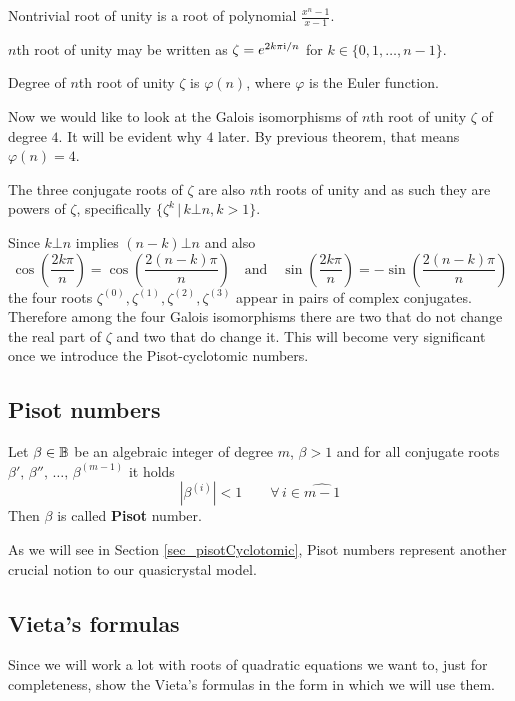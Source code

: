 \documentclass[text.tex]{subfiles}
\begin{document}
\begin{remark}
Nontrivial root of unity is a root of polynomial $\frac{x^n-1}{x-1}$.
\end{remark}

\begin{remark}
$n$th root of unity may be written as $\zeta = e^{2k\pi \mathrm{i}/n}$ for $k\in \{0, 1, \dots, n-1\}$.
\end{remark}

\begin{theorem}
Degree of $n$th root of unity $\zeta$ is $\varphi(n)$, where $\varphi$ is the Euler function.
\end{theorem}

Now we would like to look at the Galois isomorphisms of $n$th root of unity $\zeta$ of degree $4$. It will be evident why $4$ later. By previous theorem, that means $\varphi(n)=4$. 

The three conjugate roots of $\zeta$ are also $n$th roots of unity and as such they are powers of $\zeta$, specifically $\{\zeta^k\,|\,k\bot n, k>1\}$. 

Since $k\bot n$ implies $(n-k)\bot n$ and also
$$\cos\left(\frac{2k\pi}{n}\right) = \cos\left(\frac{2\left(n-k\right)\pi}{n}\right) \quad\text{and}\quad \sin\left(\frac{2k\pi}{n}\right) = -\sin\left(\frac{2\left(n-k\right)\pi}{n}\right)$$
the four roots $\zeta^{(0)}, \zeta^{(1)}, \zeta^{(2)}, \zeta^{(3)}$ appear in pairs of complex conjugates. Therefore among the four Galois isomorphisms there are two that do not change the real part of $\zeta$ and two that do change it. This will become very significant once we introduce the Pisot-cyclotomic numbers. 

\subsection{Pisot numbers}
\begin{definition}
Let $\beta\in\mathbb{B}$ be an algebraic integer of degree $m$, $\beta>1$  and for all conjugate roots $\beta',\,\beta'',\,\dots ,\,\beta^{(m-1)}$ it holds
$$|\beta^{(i)}|<1\qquad \forall\, i\in\widehat{m-1}$$
Then $\beta$ is called \textbf{Pisot} number.
\end{definition}

As we will see in Section \ref{sec_pisotCyclotomic}, Pisot numbers represent another crucial notion to our quasicrystal model. 

\subsection{Vieta's formulas}
Since we will work a lot with roots of quadratic equations we want to, just for completeness, show the Vieta's formulas in the form in which we will use them. 
\end{document}
